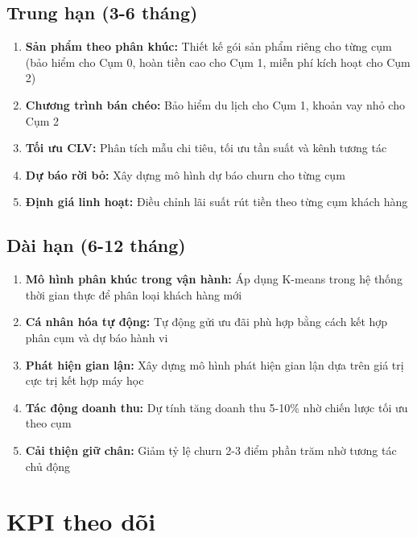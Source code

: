 \subsection{Trung hạn (3-6 tháng)}

\begin{enumerate}
    \item \textbf{Sản phẩm theo phân khúc:} Thiết kế gói sản phẩm riêng cho từng cụm (bảo hiểm cho Cụm 0, hoàn tiền cao cho Cụm 1, miễn phí kích hoạt cho Cụm 2)
    \item \textbf{Chương trình bán chéo:} Bảo hiểm du lịch cho Cụm 1, khoản vay nhỏ cho Cụm 2
    \item \textbf{Tối ưu CLV:} Phân tích mẫu chi tiêu, tối ưu tần suất và kênh tương tác
    \item \textbf{Dự báo rời bỏ:} Xây dựng mô hình dự báo churn cho từng cụm
    \item \textbf{Định giá linh hoạt:} Điều chỉnh lãi suất rút tiền theo từng cụm khách hàng
\end{enumerate}

\subsection{Dài hạn (6-12 tháng)}

\begin{enumerate}
    \item \textbf{Mô hình phân khúc trong vận hành:} Áp dụng K-means trong hệ thống thời gian thực để phân loại khách hàng mới
    \item \textbf{Cá nhân hóa tự động:} Tự động gửi ưu đãi phù hợp bằng cách kết hợp phân cụm và dự báo hành vi
    \item \textbf{Phát hiện gian lận:} Xây dựng mô hình phát hiện gian lận dựa trên giá trị cực trị kết hợp máy học
    \item \textbf{Tác động doanh thu:} Dự tính tăng doanh thu 5-10\% nhờ chiến lược tối ưu theo cụm
    \item \textbf{Cải thiện giữ chân:} Giảm tỷ lệ churn 2-3 điểm phần trăm nhờ tương tác chủ động
\end{enumerate}

\section{KPI theo dõi}

